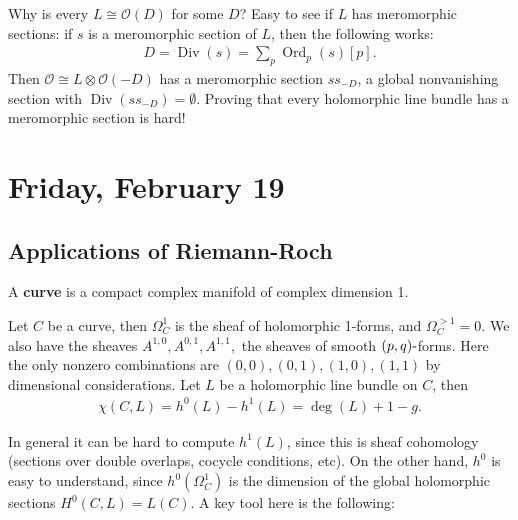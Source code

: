\begin{remark}

Why is every \(L \cong {\mathcal{O}}(D)\) for some \(D\)? Easy to see if
\(L\) has meromorphic sections: if \(s\) is a meromorphic section of
\(L\), then the following works:
\begin{align*}
D = \operatorname{Div}(s) = \sum_p {\operatorname{Ord}}_p(s) [p]
.\end{align*}
Then \({\mathcal{O}}\cong L\otimes{\mathcal{O}}(-D)\) has a meromorphic
section \(s s_{-D}\), a global nonvanishing section with
\(\operatorname{Div}(s s_{-D} ) = \emptyset\). Proving that every
holomorphic line bundle has a meromorphic section is hard!

\end{remark}

\hypertarget{friday-february-19}{%
\section{Friday, February 19}\label{friday-february-19}}

\hypertarget{applications-of-riemann-roch}{%
\subsection{Applications of
Riemann-Roch}\label{applications-of-riemann-roch}}

\begin{definition}[Curves]

A \textbf{curve} is a compact complex manifold of complex dimension 1.

\end{definition}

\begin{example}[?]

Let \(C\) be a curve, then \(\Omega_C^1\) is the sheaf of holomorphic
1-forms, and \(\Omega_C^{>1} = 0\). We also have the sheaves
\(A^{1, 0}, A^{0, 1}, A^{1, 1},\) the sheaves of smooth
\((p, q){\hbox{-}}\)forms. Here the only nonzero combinations are
\((0, 0), (0, 1), (1, 0), (1, 1)\) by dimensional considerations. Let
\(L\) be a holomorphic line bundle on \(C\), then
\begin{align*} \chi(C, L) = h^0(L) - h^1(L) = \deg(L) + 1 - g .\end{align*}

\end{example}

\begin{remark}

In general it can be hard to compute \(h^1(L)\), since this is sheaf
cohomology (sections over double overlaps, cocycle conditions, etc). On
the other hand, \(h^0\) is easy to understand, since
\(h^0( \Omega^1_C)\) is the dimension of the global holomorphic sections
\(H^0(C, L) = L(C)\). A key tool here is the following:

\end{remark}

